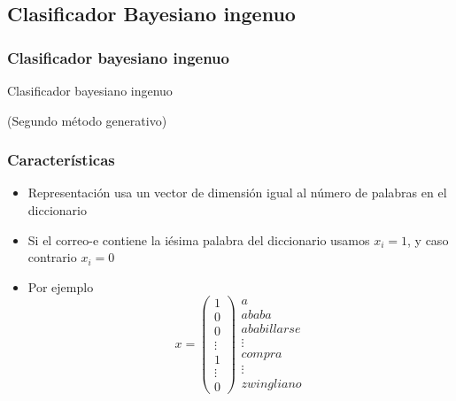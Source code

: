 \documentclass{beamer}
\begin{document}
\subsection{Clasificador Bayesiano ingenuo}
\begin{frame}
\frametitle{Clasificador bayesiano ingenuo}
\begin{center}
Clasificador bayesiano ingenuo


(Segundo método generativo)
\end{center}

\end{frame}

\begin{frame}
\frametitle{Características}


\begin{itemize}
\item Representación usa un vector de dimensión igual al número de palabras en el diccionario  
\item Si el correo-e contiene la iésima palabra del diccionario usamos $x_{i}=1$, y caso contrario $x_{i}=0$
\item Por ejemplo 
\begin{equation*}
x=\left(\begin{array}{c} 
1\\ 
0\\
0\\
\vdots \\
1 \\
\vdots \\
0
\end{array}\right)\begin{array}{c}
	a \\
	ababa \\
	ababillarse \\
	\vdots \\ 
	compra  \\
	\vdots \\
	zwingliano
\end{array}
\end{equation*}
\end{itemize}
\end{frame}
\end{document}
